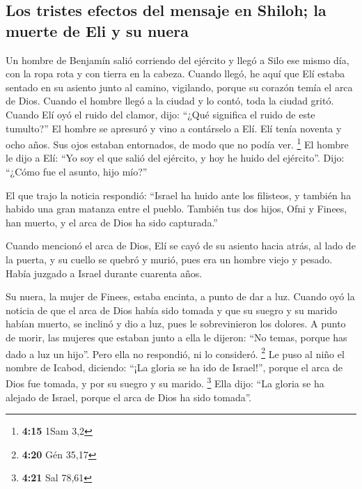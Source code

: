 \begin{paracol}{2}
\hypertarget{los-tristes-efectos-del-mensaje-en-shiloh-la-muerte-de-eli-y-su-nuera}{%
\subsection{Los tristes efectos del mensaje en Shiloh; la muerte de Eli
y su
nuera}\label{los-tristes-efectos-del-mensaje-en-shiloh-la-muerte-de-eli-y-su-nuera}}

 Un hombre de Benjamín salió corriendo del ejército y
llegó a Silo ese mismo día, con la ropa rota y con tierra en la cabeza.
 Cuando llegó, he aquí que Elí estaba sentado en su
asiento junto al camino, vigilando, porque su corazón temía el arca de
Dios. Cuando el hombre llegó a la ciudad y lo contó, toda la ciudad
gritó.  Cuando Elí oyó el ruido del clamor, dijo: ``¿Qué
significa el ruido de este tumulto?'' El hombre se apresuró y vino a
contárselo a Elí.  Elí tenía noventa y ocho años. Sus
ojos estaban entornados, de modo que no podía ver. \footnote{\textbf{4:15}
  1Sam 3,2}  El hombre le dijo a Elí: ``Yo soy el que
salió del ejército, y hoy he huido del ejército''. Dijo: ``¿Cómo fue el
asunto, hijo mío?''

 El que trajo la noticia respondió: ``Israel ha huido
ante los filisteos, y también ha habido una gran matanza entre el
pueblo. También tus dos hijos, Ofni y Finees, han muerto, y el arca de
Dios ha sido capturada.''

 Cuando mencionó el arca de Dios, Elí se cayó de su
asiento hacia atrás, al lado de la puerta, y su cuello se quebró y
murió, pues era un hombre viejo y pesado. Había juzgado a Israel durante
cuarenta años.

 Su nuera, la mujer de Finees, estaba encinta, a punto de
dar a luz. Cuando oyó la noticia de que el arca de Dios había sido
tomada y que su suegro y su marido habían muerto, se inclinó y dio a
luz, pues le sobrevinieron los dolores.  A punto de
morir, las mujeres que estaban junto a ella le dijeron: ``No temas,
porque has dado a luz un hijo''. Pero ella no respondió, ni lo
consideró. \footnote{\textbf{4:20} Gén 35,17}  Le puso al
niño el nombre de Icabod, diciendo: ``¡La gloria se ha ido de Israel!'',
porque el arca de Dios fue tomada, y por su suegro y su marido.
\footnote{\textbf{4:21} Sal 78,61}  Ella dijo: ``La
gloria se ha alejado de Israel, porque el arca de Dios ha sido tomada''.


\end{paracol}
